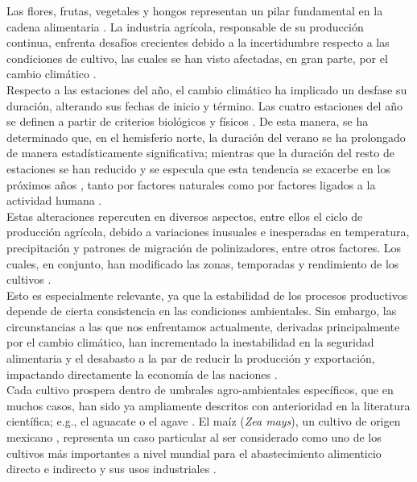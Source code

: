 Las flores, frutas, vegetales y hongos representan un pilar fundamental en la cadena alimentaria \cite{Cassani_2022}. La industria agrícola, responsable de su producción continua, enfrenta desafíos crecientes debido a la incertidumbre respecto a las condiciones de cultivo, las cuales se han visto afectadas, en gran parte, por el cambio climático \cite{Parajuli_2019}.\\


Respecto a las estaciones del año, el cambio climático ha implicado un desfase su duración, alterando sus fechas de inicio y término. Las cuatro estaciones del año se definen a partir de criterios biológicos y físicos \cite{Trenberth_1983}. De esta manera, se ha determinado que, en el hemisferio norte, la duración del verano se ha prolongado de manera estadísticamente significativa; mientras que la duración del resto de estaciones se han reducido y se especula que esta tendencia se exacerbe en los próximos años \cite{Wang_2021}, tanto por factores naturales como por factores ligados a la actividad humana \cite{Park_2018}.\\

Estas alteraciones repercuten en diversos aspectos, entre ellos el ciclo de producción agrícola, debido a variaciones inusuales e inesperadas en temperatura, precipitación y patrones de migración de polinizadores, entre otros factores. Los cuales, en conjunto, han modificado las zonas, temporadas y rendimiento de los cultivos \cite{Bayable_2021, Cuevas_2021, Parajuli_2019}.\\

Esto es especialmente relevante, ya que la estabilidad de los procesos productivos depende de cierta consistencia en las condiciones ambientales. Sin embargo, las circunstancias a las que nos enfrentamos actualmente, derivadas principalmente por el cambio climático, han incrementado la inestabilidad en la seguridad alimentaria y el desabasto a la par de reducir la producción y exportación, impactando directamente la economía de las naciones \cite{Farooq_2022}.\\


Cada cultivo prospera dentro de umbrales agro-ambientales específicos, que en muchos casos, han sido ya ampliamente descritos con anterioridad en la literatura científica; e.g., el aguacate \cite{Moraes_2022, Rocha-Arroyo_2011} o el agave \cite{García-Mendoza_2002}. El maíz (\textit{Zea mays}), un cultivo de origen mexicano \cite{OrozcoRamrez_2016}, representa un caso particular al ser considerado como uno de los cultivos más importantes a nivel mundial para el abastecimiento alimenticio directo e indirecto y sus usos industriales \cite{Revilla_2022}.\\

